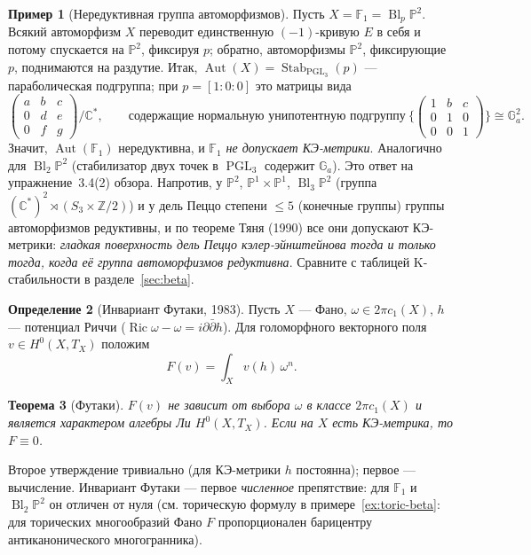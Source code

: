 \documentclass[11pt,a4paper]{article}
\theoremstyle{plain}
\newtheorem{theorem}{Теорема}[section]
\theoremstyle{definition}
\newtheorem{definition}[theorem]{Определение}
\newtheorem{example}[theorem]{Пример}
\theoremstyle{remark}
\renewcommand{\C}{\mathbb{C}}
\newcommand{\Z}{\mathbb{Z}}
\newcommand{\PP}{\mathbb{P}}
\DeclareMathOperator{\Bl}{Bl}
\DeclareMathOperator{\PGL}{PGL}
\DeclareMathOperator{\Aut}{Aut}
\DeclareMathOperator{\Stab}{Stab}
\DeclareMathOperator{\Ric}{Ric}
\begin{document}
\begin{example}[Нередуктивная группа автоморфизмов]\label{ex:Aut-F1}
Пусть $X=\mathbb F_1=\Bl_p\PP^2$. Всякий автоморфизм $X$ переводит единственную $(-1)$-кривую $E$ в
себя и потому спускается на $\PP^2$, фиксируя $p$; обратно, автоморфизмы $\PP^2$, фиксирующие $p$,
поднимаются на раздутие. Итак, $\Aut(X)=\Stab_{\PGL_3}(p)$ --- параболическая подгруппа; при
$p=[1:0:0]$ это матрицы вида
\[
\begin{pmatrix}a&b&c\\0&d&e\\0&f&g\end{pmatrix}\!\!\Big/\C^*,\qquad\text{содержащие нормальную
унипотентную подгруппу}\ \Big\{\begin{pmatrix}1&b&c\\0&1&0\\0&0&1\end{pmatrix}\Big\}\cong\mathbb G_a^2 .
\]
Значит, $\Aut(\mathbb F_1)$ нередуктивна, и \emph{$\mathbb F_1$ не допускает КЭ-метрики}. Аналогично для
$\Bl_2\PP^2$ (стабилизатор двух точек в $\PGL_3$ содержит $\mathbb G_a$). Это ответ на упражнение~3.4(2)
обзора. Напротив, у $\PP^2$, $\PP^1\times\PP^1$, $\Bl_3\PP^2$ (группа $(\C^*)^2\rtimes(S_3\times\Z/2)$)
и у дель Пеццо степени $\le5$ (конечные группы) группы автоморфизмов редуктивны, и по теореме Тяня
(1990) все они допускают КЭ-метрики: \emph{гладкая поверхность дель Пеццо кэлер-эйнштейнова тогда и
только тогда, когда её группа автоморфизмов редуктивна}. Сравните с таблицей K-стабильности в
разделе~\ref{sec:beta}.
\end{example}

\begin{definition}[Инвариант Футаки, 1983]\label{def:Futaki-classical}
Пусть $X$ --- Фано, $\omega\in2\pi c_1(X)$, $h$ --- потенциал Риччи ($\Ric\omega-\omega=i\partial\bar\partial h$).
Для голоморфного векторного поля $v\in H^0(X,T_X)$ положим
\[
F(v)=\int_Xv(h)\,\omega^n .
\]
\end{definition}

\begin{theorem}[Футаки]\label{thm:Futaki-classical}
$F(v)$ не зависит от выбора $\omega$ в классе $2\pi c_1(X)$ и является характером алгебры Ли
$H^0(X,T_X)$. Если на $X$ есть КЭ-метрика, то $F\equiv0$.
\end{theorem}

Второе утверждение тривиально (для КЭ-метрики $h$ постоянна); первое --- вычисление. Инвариант
Футаки --- первое \emph{численное} препятствие: для $\mathbb F_1$ и $\Bl_2\PP^2$ он отличен от нуля
(см. торическую формулу в примере~\ref{ex:toric-beta}: для торических многообразий Фано $F$
пропорционален барицентру антиканонического многогранника).
\end{document}
